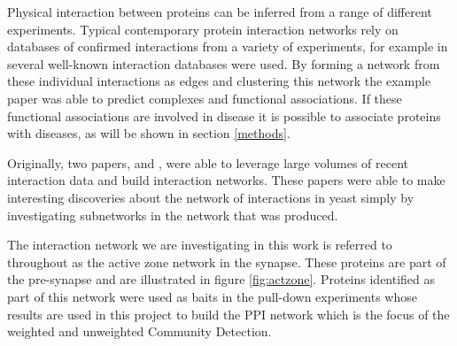 Physical interaction between proteins can be inferred from a range of different experiments.
Typical contemporary protein interaction networks rely on databases of confirmed interactions from a variety of experiments, for example in \textcite{kenley_detecting_2011} several well-known interaction databases were used. %
By forming a network from these individual interactions as edges and clustering this network the example paper was able to predict complexes and functional associations. %
If these functional associations are involved in disease it is possible to associate proteins with diseases, as will be shown in section \ref{methods}. %

Originally, two papers, \textcite{ito_comprehensive_2001} and \textcite{uetz_comprehensive_2000}, were able to leverage large volumes of recent interaction data and build interaction networks. %
These papers were able to make interesting discoveries about the network of interactions in yeast simply by investigating subnetworks in the network that was produced.  %

The interaction network we are investigating in this work is referred to throughout as the active zone network in the synapse.
These proteins are part of the pre-synapse and are illustrated in figure \ref{fig:actzone}.
Proteins identified as part of this network were used as baits in the pull-down experiments whose results are used in this project to build the PPI network which is the focus of the weighted and unweighted Community Detection.

